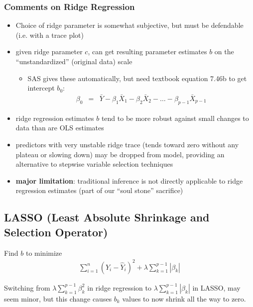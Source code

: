 \documentclass[12pt]{notes}
\begin{document}
\subsubsection{Comments on Ridge Regression}
\begin{itemize}
  \item Choice of ridge parameter is somewhat subjective, but must be defendable (i.e. with a trace plot)
  \item given ridge parameter $c$, can get resulting parameter estimates ${b}$ on the ``unstandardized'' (original data) scale
      \begin{itemize}
        \item SAS gives these automatically, but need textbook equation 7.46b to get intercept $b_0$:
             \begin{eqnarray}
               \beta_0 & = & \bar{Y} - \beta_1 \bar{X}_1 - \beta_2 \bar{X}_2 - \ldots - \beta_{p-1} \bar{X}_{p-1} \nonumber
             \end{eqnarray}
      \end{itemize}
  \item ridge regression estimates ${b}$ tend to be more robust against small changes to data than are OLS estimates
  \item predictors with very unstable ridge trace (tends toward zero without any plateau or slowing down) may be dropped from model, providing an alternative to stepwise variable selection techniques
\item {\bf major limitation}: traditional inference is not directly applicable to ridge regression estimates (part of our ``soul stone'' sacrifice)\\
\end{itemize}

\subsection{LASSO (Least Absolute Shrinkage and Selection Operator)}

Find $b$ to minimize
  \begin{eqnarray}
    \sum_{i=1}^{n} \left( Y_i - \hat{Y}_i \right)^2 + \lambda \sum_{k=1}^{p-1} |\beta_k| \nonumber
  \end{eqnarray}
  
 Switching from $\lambda \sum_{k=1}^{p-1} \beta_k^2$ in ridge regression to $\lambda \sum_{k=1}^{p-1} |\beta_k|$ in LASSO, may seem minor, but this change causes $b_k$ values to now shrink all the way to zero. 
\end{document}
